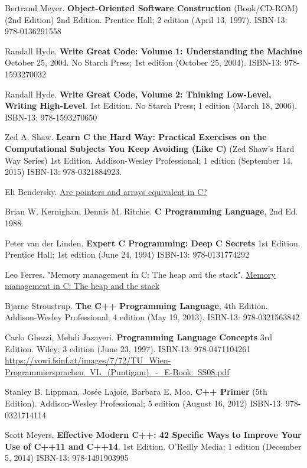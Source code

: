 \documentclass[10pt]{amsart}
\begin{document}
\begin{thebibliography}{9}
Bertrand Meyer. \textbf{Object-Oriented Software Construction} (Book/CD-ROM) (2nd Edition) 2nd Edition.   Prentice Hall; 2 edition (April 13, 1997).  ISBN-13: 978-0136291558

Randall Hyde.  \textbf{Write Great Code: Volume 1: Understanding the Machine} October 25, 2004.  No Starch Press; 1st edition (October 25, 2004).  ISBN-13: 978-1593270032

Randall Hyde.  \textbf{Write Great Code, Volume 2: Thinking Low-Level, Writing High-Level}.   1st Edition.  No Starch Press; 1 edition (March 18, 2006).  ISBN-13: 978-1593270650

Zed A. Shaw.  \textbf{Learn C the Hard Way: Practical Exercises on the Computational Subjects You Keep Avoiding (Like C)} (Zed Shaw's Hard Way Series) 1st Edition.  Addison-Wesley Professional; 1 edition (September 14, 2015) ISBN-13: 978-0321884923.  

Eli Bendersky.   \href{https://eli.thegreenplace.net/2009/10/21/are-pointers-and-arrays-equivalent-in-c}{Are pointers and arrays equivalent in C?}

Brian W. Kernighan, Dennis M. Ritchie.  \textbf{C Programming Language}, 2nd Ed. 1988.   

Peter van der Linden.  \textbf{Expert C Programming: Deep C Secrets} 1st Edition.  Prentice Hall; 1st edition (June 24, 1994)  ISBN-13: 978-0131774292

Leo Ferres.  "Memory management in C: The heap and the stack".  \href{http://www.inf.udec.cl/~leo/teoX.pdf}{Memory management in C: The heap and the stack}


Bjarne Stroustrup.  \textbf{The C++ Programming Language}, 4th Edition. Addison-Wesley Professional; 4 edition (May 19, 2013).  ISBN-13: 978-0321563842

Carlo Ghezzi, Mehdi Jazayeri.  \textbf{Programming Language Concepts} 3rd Edition.  Wiley; 3 edition (June 23, 1997).  ISBN-13: 978-0471104261  \url{https://vowi.fsinf.at/images/7/72/TU_Wien-Programmiersprachen_VL_(Puntigam)_-_E-Book_SS08.pdf}

Stanley B. Lippman, Jos\'{e}e Lajoie, Barbara E. Moo. \textbf{C++ Primer} (5th Edition).  Addison-Wesley Professional; 5 edition (August 16, 2012) ISBN-13: 978-0321714114 

Scott Meyers.  \textbf{Effective Modern C++: 42 Specific Ways to Improve Your Use of C++11 and C++14}. 1st Edition.  O'Reilly Media; 1 edition (December 5, 2014)  ISBN-13: 978-1491903995


\end{thebibliography}
\end{document}
